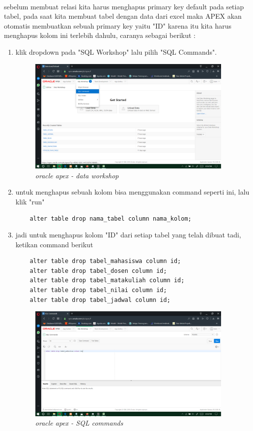 \documentclass[12pt]{ociamthesis}  %
\begin{document}
\paragraph{}
sebelum membuat relasi kita harus menghapus primary key default pada setiap tabel, pada saat kita membuat tabel dengan data dari excel maka APEX akan otomatis membuatkan sebuah primary key yaitu "ID" karena itu kita harus menghapus kolom ini terlebih dahulu, caranya sebagai berikut :
\begin{enumerate}
	\item klik dropdown pada "SQL Workshop" lalu pilih "SQL Commands".
	\begin{figure}[H]
    \centering
	\includegraphics[width=10cm]{figures/SQL commands/Screenshot (230).png} 
    \caption{\textit{oracle apex - data workshop}}
    \label{foto21}
 	\end{figure}
	\item untuk menghapus sebuah kolom bisa menggunakan command seperti ini, lalu klik "run"
	\begin{verbatim}
	alter table drop nama_tabel column nama_kolom; 
	\end{verbatim}
	\item jadi untuk menghapus kolom "ID" dari setiap tabel yang telah dibuat tadi, ketikan command berikut
	\begin{verbatim}
	alter table drop tabel_mahasiswa column id;
	alter table drop tabel_dosen column id;
	alter table drop tabel_matakuliah column id;
	alter table drop tabel_nilai column id;
	alter table drop tabel_jadwal column id;
	\end{verbatim}
	\begin{figure}[H]
    \centering
	\includegraphics[width=10cm]{figures/SQL commands/Screenshot (231).png} 
    \caption{\textit{oracle apex - SQL commands}}
    \label{foto21}
 	\end{figure}	
	\end{enumerate}
\end{document}
